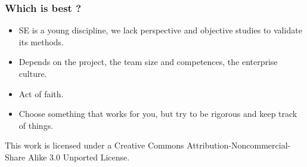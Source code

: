 \documentclass[10pt]{beamer}
\begin{document}
\begin{frame}[fragile]
  \frametitle{Which is best ?}
  \begin{itemize}
    \item SE is a young discipline, we lack perspective and objective studies to
      validate its methods.
    \item Depends on the project, the team size and competences, the enterprise
      culture.
    \item Act of faith.
    \item Choose something that works for you, but try to be rigorous and keep
      track of things.
  \end{itemize}
\end{frame}

\begin{frame}[fragile]
  \begin{center}
    \tiny
    This work is licensed under a Creative Commons Attribution-Noncommercial-Share Alike 3.0 Unported License.
  \end{center}
\end{frame}
\end{document}
